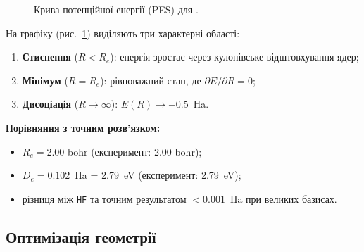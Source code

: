 \begin{figure}[h!]\centering
	
	\caption{Крива потенційної енергії (PES) для .}
	\label{pic:h2plus_pes}
\end{figure}

На графіку (рис.~\ref{pic:h2plus_pes}) виділяють три характерні області:
\begin{enumerate}
	\item \textbf{Стиснення} ($R < R_e$): енергія зростає через кулонівське відштовхування ядер;
	\item \textbf{Мінімум} ($R = R_e$): рівноважний стан, де $\partial E / \partial R = 0$;
	\item \textbf{Дисоціація} ($R \to \infty$): $E(R) \to -0.5$~Ha.
\end{enumerate}

\textbf{Порівняння з точним розв’язком:}
\begin{itemize}
	\item $R_e = 2.00$ bohr (експеримент: 2.00 bohr);
	\item $D_e = 0.102$~Ha = 2.79~eV (експеримент: 2.79~eV);
	\item різниця між \texttt{HF} та точним результатом $< 0.001$~Ha при великих базисах.
\end{itemize}


\subsection{Оптимізація геометрії}


